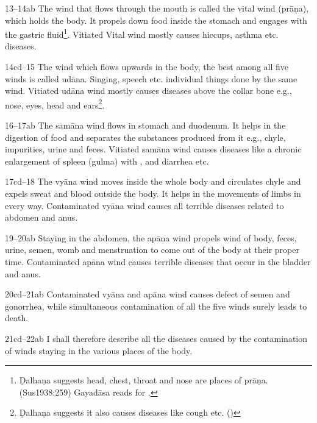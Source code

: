 \begin{translation}
\item[13--14ab] The wind that flows through the mouth is called the
vital wind (prāṇa), which holds the body. It propels down food inside the
stomach and engages with the gastric fluid\footnote{ Ḍalhaṇa suggests
head, chest, throat and nose are places of prāṇa. (Sus1938:259)
Gayadāsa reads  for .}. Vitiated Vital wind
mostly causes hiccups, asthma etc. diseases.

\item[14cd--15] The wind which flows upwards in the body, the best among
all five winds is called udāna. Singing, speech etc. individual things
done by the same wind. Vitiated udāna wind mostly causes diseases above
the collar bone e.g., nose, eyes, head and ears\footnote{ Ḍalhaṇa
suggests it also causes diseases like cough etc. ()}.

\item [16--17ab] The samāna wind flows in stomach and duodenum. It helps
in the digestion of food and separates the substances
produced from it e.g., chyle, impurities, urine and feces. Vitiated
samāna wind causes diseases like a chronic enlargement of spleen (gulma) with
, and diarrhea etc.

\item[17cd--18] The vyāna wind moves inside the whole body and circulates
chyle and expels sweat and blood outside the body. It helps in the
movements of limbs in every way. Contaminated vyāna wind causes all terrible
diseases related to abdomen and anus.

\item[19--20ab] Staying in the abdomen, the apāna wind propels wind of
body, feces, urine, semen, womb and menstruation to come out of the body
at their proper time. Contaminated apāna wind causes terrible diseases
that occur in the bladder and anus.

\item[20cd--21ab] Contaminated vyāna and apāna wind causes defect of 
semen 
and gonorrhea, while simultaneous contamination of all the five winds surely 
leads to death.  


\item[21cd--22ab] I shall therefore describe all the diseases caused by the 
contamination of winds staying in the various places of the body.


\end{translation}
